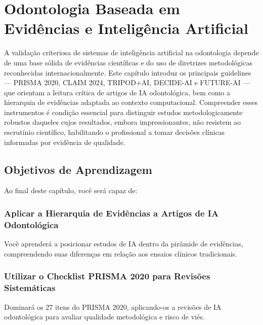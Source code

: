 
\chapter{Odontologia Baseada em Evidências e Inteligência Artificial}
\label{cap:evidencia-revisoes}

\nivelbasico

A validação criteriosa de sistemas de inteligência artificial na odontologia depende de uma base sólida de evidências científicas e do uso de diretrizes metodológicas reconhecidas internacionalmente. Este capítulo introduz os principais guidelines — PRISMA 2020, CLAIM 2024, TRIPOD+AI, DECIDE-AI e FUTURE-AI — que orientam a leitura crítica de artigos de IA odontológica, bem como a hierarquia de evidências adaptada ao contexto computacional. Compreender esses instrumentos é condição essencial para distinguir estudos metodologicamente robustos daqueles cujos resultados, embora impressionantes, não resistem ao escrutínio científico, habilitando o profissional a tomar decisões clínicas informadas por evidência de qualidade.

\section{Objetivos de Aprendizagem}

Ao final deste capítulo, você será capaz de:

\subsection{Aplicar a Hierarquia de Evidências a Artigos de IA Odontológica}
Você aprenderá a posicionar estudos de IA dentro da pirâmide de evidências, compreendendo suas diferenças em relação aos ensaios clínicos tradicionais.

\subsection{Utilizar o Checklist PRISMA 2020 para Revisões Sistemáticas}
Dominará os 27 itens do PRISMA 2020, aplicando-os a revisões de IA odontológica para avaliar qualidade metodológica e risco de viés.

